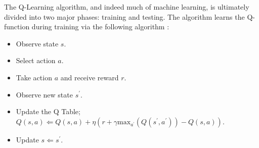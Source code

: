 \documentclass[12pt,a4paper]{article}
\begin{document}
		\par The Q-Learning algorithm, and indeed much of machine learning, is ultimately divided into two major phases: training and testing. The algorithm learns the Q-function during training via the following algorithm \cite{RL}:
		
		\begin{itemize}
			\item Observe state $s$.
			\item Select action $a$.
			\item Take action $a$ and receive reward $r$.
			\item Observe new state $s^\prime$.
			\item Update the Q Table; $Q(s,a) \Leftarrow Q(s,a) + \eta(r + \gamma \text{max}_{a^\prime}(Q(s^\prime, a^\prime)) - Q(s,a))$.
			\item Update $s \Leftarrow s^\prime$.
		\end{itemize}
		
\end{document}
